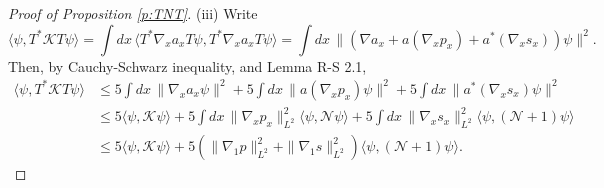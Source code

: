 \documentclass[11pt,a4paper]{scrartcl} %
\newcommand{\N}{\mathcal{N}}
\newcommand{\K}{\mathcal{K}}
\begin{document}
\begin{proof}[Proof of Proposition \ref{p:TNT}]
  (iii) Write
  \[
    \langle \psi, T^* \K T \psi \rangle = \int dx \, \langle T^* \nabla_x a_x
    T \psi, T^* \nabla_x a_x T \psi \rangle = \int dx \, \| (\nabla a_x +
    a(\nabla_x p_x) + a^*(\nabla_x s_x)) \psi \|^2.
  \]
  Then, by Cauchy-Schwarz inequality, and Lemma R-S 2.1,
  \begin{align*}
    \langle \psi, T^* \K T \psi \rangle & \le 5 \int dx \, \| \nabla_x a_x
    \psi \|^2 + 5 \int dx \, \| a(\nabla_x p_x) \psi \|^2 + 5 \int dx \, \|
    a^*(\nabla_x s_x) \psi \|^2 \\
    & \le 5 \langle \psi, \K \psi \rangle + 5 \int dx \, \| \nabla_x p_x
    \|_{L^2}^2 \langle \psi, \N \psi \rangle + 5 \int dx \, \| \nabla_x s_x
    \|_{L^2}^2 \langle \psi, (\N+1) \psi \rangle \\
    & \le 5 \langle \psi, \K \psi \rangle + 5 (\| \nabla_1 p \|_{L^2}^2 + \|
    \nabla_1 s \|_{L^2}^2) \langle \psi, (\N+1) \psi \rangle.
  \end{align*}
\end{proof}
\end{document}
